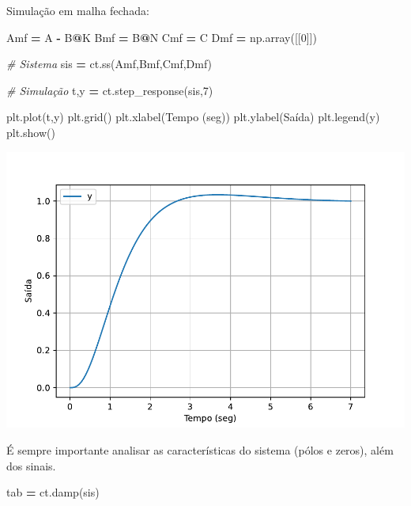 \documentclass[
]{book}
\newenvironment{Shaded}{\begin{snugshade}}{\end{snugshade}}
\newcommand{\CommentTok}[1]{\textcolor[rgb]{0.56,0.35,0.01}{\textit{#1}}}
\newcommand{\DecValTok}[1]{\textcolor[rgb]{0.00,0.00,0.81}{#1}}
\newcommand{\NormalTok}[1]{#1}
\newcommand{\OperatorTok}[1]{\textcolor[rgb]{0.81,0.36,0.00}{\textbf{#1}}}
\newcommand{\StringTok}[1]{\textcolor[rgb]{0.31,0.60,0.02}{#1}}
\begin{document}
Simulação em malha fechada:

\begin{Shaded}
\begin{Highlighting}[]
\NormalTok{Amf }\OperatorTok{=}\NormalTok{ A }\OperatorTok{{-}}\NormalTok{ B}\OperatorTok{@}\NormalTok{K}
\NormalTok{Bmf }\OperatorTok{=}\NormalTok{ B}\OperatorTok{@}\NormalTok{N}
\NormalTok{Cmf }\OperatorTok{=}\NormalTok{ C}
\NormalTok{Dmf }\OperatorTok{=}\NormalTok{ np.array([[}\DecValTok{0}\NormalTok{]])}

\CommentTok{\# Sistema}
\NormalTok{sis }\OperatorTok{=}\NormalTok{ ct.ss(Amf,Bmf,Cmf,Dmf)}

\CommentTok{\# Simulação}
\NormalTok{t,y }\OperatorTok{=}\NormalTok{ ct.step\_response(sis,}\DecValTok{7}\NormalTok{)}

\NormalTok{plt.plot(t,y)}
\NormalTok{plt.grid()}
\NormalTok{plt.xlabel(}\StringTok{\textquotesingle{}Tempo (seg)\textquotesingle{}}\NormalTok{)}
\NormalTok{plt.ylabel(}\StringTok{\textquotesingle{}Saída\textquotesingle{}}\NormalTok{)}
\NormalTok{plt.legend(}\StringTok{\textquotesingle{}y\textquotesingle{}}\NormalTok{)}
\NormalTok{plt.show()}
\end{Highlighting}
\end{Shaded}

\includegraphics{_main_files/figure-latex/unnamed-chunk-40-3.pdf}

É sempre importante analisar as características do sistema (pólos e zeros), além dos sinais.

\begin{Shaded}
\begin{Highlighting}[]
\NormalTok{tab }\OperatorTok{=}\NormalTok{ ct.damp(sis)}
\end{Highlighting}
\end{Shaded}
\end{document}
